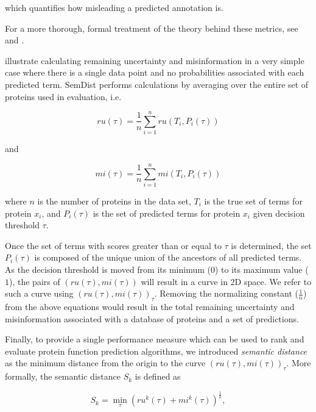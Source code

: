 \documentclass{article}
\begin{document}
\noindent which quantifies how misleading a predicted annotation is. 

For a more thorough, formal treatment of the theory behind these metrics, see \citet{Clark2013} and \citet{Clark2014Information}.

 illustrate calculating remaining uncertainty and misinformation in a very simple case where there is a single data point and no probabilities associated with each predicted term. SemDist performs calculations by averaging over the entire set of proteins used in evaluation, i.e.

\begin{equation}
ru(\tau)=\frac{1}{n}\sum_{i=1}^{n}ru(T_{i},P_{i}(\tau))
\label{eq:average_ru}
\end{equation}


\noindent and

\begin{equation}
mi(\tau)=\frac{1}{n}\sum_{i=1}^{n}mi(T_{i},P_{i}(\tau))
\label{eq:average_mi}
\end{equation}


\noindent where $n$ is the number of proteins in the data set, $T_{i}$ is the true set of terms for protein $x_{i}$, and $P_{i}(\tau)$ is the set of predicted terms for protein $x_{i}$ given decision threshold $\tau$. 

Once the set of terms with scores greater than or equal to $\tau$ is determined, the set $P_{i}(\tau)$ is composed of the unique union of the ancestors of all predicted terms. As the decision threshold is moved from its minimum ($0$) to its maximum value ($1$), the pairs of $(ru(\tau),mi(\tau))$ will result in a curve in 2D space. We refer to such a curve using $(ru(\tau),mi(\tau))_{\tau}$. Removing the normalizing constant ($\frac{1}{n}$) from the above equations would result in the total remaining uncertainty and misinformation associated with a database of proteins and a set of predictions.

Finally, to provide a single performance measure which can be used to rank and evaluate protein function prediction algorithms, we introduced \emph{semantic distance} as the minimum distance from the origin to the curve $(ru(\tau),mi(\tau))_{\tau}$. More formally, the semantic distance $S_{k}$ is defined as

\begin{equation}
S_{k}=\underset{\tau}{\min}(ru^{k}(\tau)+mi^{k}(\tau))^{\frac{1}{k}},
\label{eq:semantic_distance}
\end{equation}
\end{document}
